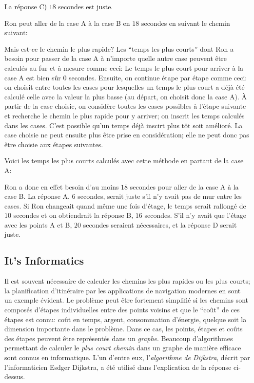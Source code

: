 \documentclass[a4paper,11pt]{report}
\newcommand{\taskGraphicsFolder}{..}
\begin{document}
La réponse C) $18$ secondes est juste.

Ron peut aller de la case A à la case B en $18$ secondes en suivant le chemin suivant:

{\centering%
\par}

Mais est-ce le chemin le plus rapide? Les “temps les plus courts” dont Ron a besoin pour passer de la case A à n’importe quelle autre case peuvent être calculés au fur et à mesure comme ceci:
Le temps le plus court pour arriver à la case A est bien sûr $0$ secondes. Ensuite, on continue étape par étape comme ceci: on choisit entre toutes les cases pour lesquelles un temps le plus court a déjà été calculé celle avec la valeur la plus basse (au départ, on choisit donc la case A). À partir de la case choisie, on considère toutes les cases possibles à l’étape suivante et recherche le chemin le plus rapide pour y arriver; on inscrit les temps calculés dans les cases. C’est possible qu’un temps déjà inscirt plus tôt soit amélioré. La case choisie ne peut ensuite plus être prise en considération; elle ne peut donc pas être choisie aux étapes suivantes.

Voici les temps les plus courts calculés avec cette méthode en partant de la case A:

{\centering%
\par}

Ron a donc en effet besoin d’au moins $18$ secondes pour aller de la case A à la case B. La réponse A, $6$ secondes, serait juste s’il n’y avait pas de mur entre les cases. Si Ron changeait quand même une fois d’étage, le temps serait rallongé de $10$ secondes et on obtiendrait la réponse B, $16$ secondes. S’il n’y avait que l’étage avec les points A et B, $20$ secondes seraient nécessaires, et la réponse D serait juste.


\subsection*{It’s Informatics}

Il est souvent nécessaire de calculer les chemins les plus rapides ou les plus courts; la planification d’itinéraire par les applications de navigation modernes en sont un exemple évident. Le problème peut être fortement simplifié si les chemins sont composés d’étapes individuelles entre des points voisins et que le “coût” de ces étapes est connu: coût en temps, argent, consommation d’énergie, quelque soit la dimension importante dans le problème. Dans ce cas, les points, étapes et coûts des étapes peuvent être représentés dans un \emph{graphe}. Beaucoup d’algorithmes permettant de calculer le \emph{plus court chemin} dans un graphe de manière efficace sont connus en informatique. L’un d’entre eux, l’\emph{algorithme de Dijkstra}, décrit par l’informaticien Esdger Dijkstra, a été utilisé dans l’explication de la réponse ci-dessus.
\end{document}
